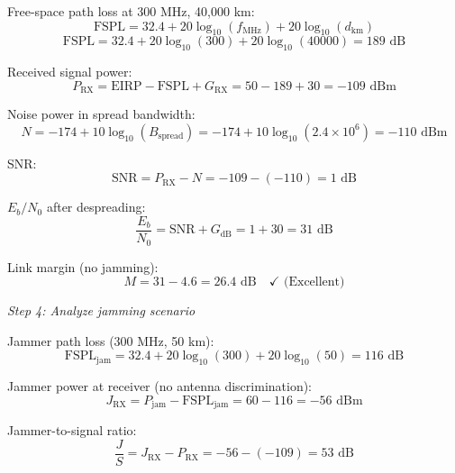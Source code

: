 Free-space path loss at 300 MHz, 40,000 km:
\begin{equation}
\text{FSPL} = 32.4 + 20\log_{10}(f_{\text{MHz}}) + 20\log_{10}(d_{\text{km}})
\end{equation}
\begin{equation}
\text{FSPL} = 32.4 + 20\log_{10}(300) + 20\log_{10}(40000) = 189 \text{ dB}
\end{equation}

Received signal power:
\begin{equation}
P_{\text{RX}} = \text{EIRP} - \text{FSPL} + G_{\text{RX}} = 50 - 189 + 30 = -109 \text{ dBm}
\end{equation}

Noise power in spread bandwidth:
\begin{equation}
N = -174 + 10\log_{10}(B_{\text{spread}}) = -174 + 10\log_{10}(2.4 \times 10^6) = -110 \text{ dBm}
\end{equation}

SNR:
\begin{equation}
\text{SNR} = P_{\text{RX}} - N = -109 - (-110) = 1 \text{ dB}
\end{equation}

$E_b/N_0$ after despreading:
\begin{equation}
\frac{E_b}{N_0} = \text{SNR} + G_{\text{dB}} = 1 + 30 = 31 \text{ dB}
\end{equation}

Link margin (no jamming):
\begin{equation}
M = 31 - 4.6 = 26.4 \text{ dB} \quad \checkmark \text{ (Excellent)}
\end{equation}

\textit{Step 4: Analyze jamming scenario}

Jammer path loss (300 MHz, 50 km):
\begin{equation}
\text{FSPL}_{\text{jam}} = 32.4 + 20\log_{10}(300) + 20\log_{10}(50) = 116 \text{ dB}
\end{equation}

Jammer power at receiver (no antenna discrimination):
\begin{equation}
J_{\text{RX}} = P_{\text{jam}} - \text{FSPL}_{\text{jam}} = 60 - 116 = -56 \text{ dBm}
\end{equation}

Jammer-to-signal ratio:
\begin{equation}
\frac{J}{S} = J_{\text{RX}} - P_{\text{RX}} = -56 - (-109) = 53 \text{ dB}
\end{equation}

